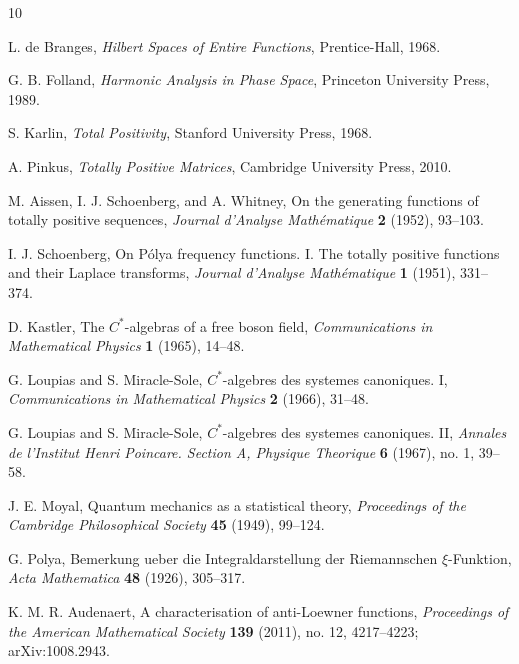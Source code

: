 \documentclass[11pt]{article}
\begin{document}
\begin{thebibliography}{10}

L. de Branges,
\emph{Hilbert Spaces of Entire Functions},
Prentice-Hall, 1968.

G. B. Folland,
\emph{Harmonic Analysis in Phase Space},
Princeton University Press, 1989.

S. Karlin,
\emph{Total Positivity},
Stanford University Press, 1968.

A. Pinkus,
\emph{Totally Positive Matrices},
Cambridge University Press, 2010.

M. Aissen, I. J. Schoenberg, and A. Whitney,
On the generating functions of totally positive sequences,
\emph{Journal d'Analyse Mathématique} \textbf{2} (1952), 93--103.

I. J. Schoenberg,
On Pólya frequency functions. I. The totally positive functions and their
Laplace transforms,
\emph{Journal d'Analyse Mathématique} \textbf{1} (1951), 331--374.

D. Kastler,
The $C^*$-algebras of a free boson field,
\emph{Communications in Mathematical Physics} \textbf{1} (1965), 14--48.

G. Loupias and S. Miracle-Sole,
$C^*$-algebres des systemes canoniques. I,
\emph{Communications in Mathematical Physics} \textbf{2} (1966), 31--48.

G. Loupias and S. Miracle-Sole,
$C^*$-algebres des systemes canoniques. II,
\emph{Annales de l'Institut Henri Poincare. Section A, Physique Theorique}
\textbf{6} (1967), no. 1, 39--58.

J. E. Moyal,
Quantum mechanics as a statistical theory,
\emph{Proceedings of the Cambridge Philosophical Society}
\textbf{45} (1949), 99--124.

G. Polya,
Bemerkung ueber die Integraldarstellung der Riemannschen $\xi$-Funktion,
\emph{Acta Mathematica} \textbf{48} (1926), 305--317.

K. M. R. Audenaert,
A characterisation of anti-Loewner functions,
\emph{Proceedings of the American Mathematical Society}
\textbf{139} (2011), no. 12, 4217--4223; arXiv:1008.2943.

\end{thebibliography}
\end{document}
